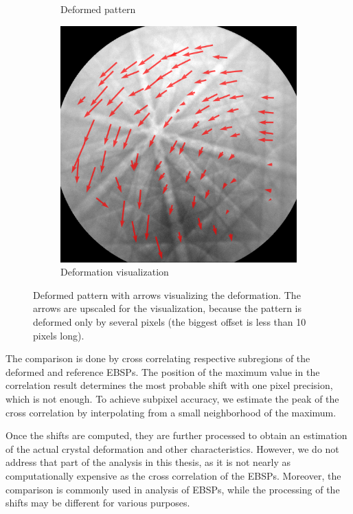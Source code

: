 \begin{figure}
\begin{subfigure}{.5\textwidth}
		\caption{Deformed pattern}
		\label{fig:sub2}
	\end{subfigure}
	\centering
	\begin{subfigure}{.5\textwidth}
		\centering
		\includegraphics[width=.9\linewidth]{img/roi_shifts}
		\caption{Deformation visualization}
		\label{fig:sub2}
	\end{subfigure}

	\caption{Deformed pattern with arrows visualizing the deformation. The arrows are upscaled for the visualization, because the pattern is deformed only by several pixels (the biggest offset is less than 10 pixels long).}
	\label{roi-shifts}
\end{figure}

The comparison is done by cross correlating respective subregions of the deformed and reference EBSPs. The position of the maximum value in the correlation result determines the most probable shift with one pixel precision, which is not enough. To achieve subpixel accuracy, we estimate the peak of the cross correlation by interpolating from a small neighborhood of the maximum.

Once the shifts are computed, they are further processed to obtain an estimation of the actual crystal deformation and other characteristics. However, we do not address that part of the analysis in this thesis, as it is not nearly as computationally expensive as the cross correlation of the EBSPs. Moreover, the comparison is commonly used in analysis of EBSPs, while the processing of the shifts may be different for various purposes.


